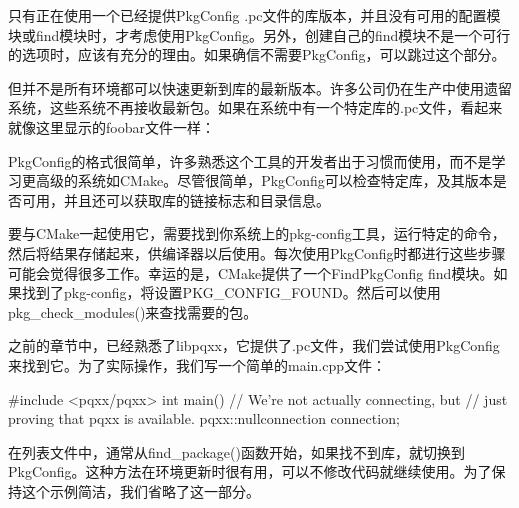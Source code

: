 只有正在使用一个已经提供PkgConfig .pc文件的库版本，并且没有可用的配置模块或find模块时，才考虑使用PkgConfig。另外，创建自己的find模块不是一个可行的选项时，应该有充分的理由。如果确信不需要PkgConfig，可以跳过这个部分。

但并不是所有环境都可以快速更新到库的最新版本。许多公司仍在生产中使用遗留系统，这些系统不再接收最新包。如果在系统中有一个特定库的.pc文件，看起来就像这里显示的foobar文件一样：


PkgConfig的格式很简单，许多熟悉这个工具的开发者出于习惯而使用，而不是学习更高级的系统如CMake。尽管很简单，PkgConfig可以检查特定库，及其版本是否可用，并且还可以获取库的链接标志和目录信息。

要与CMake一起使用它，需要找到你系统上的pkg-config工具，运行特定的命令，然后将结果存储起来，供编译器以后使用。每次使用PkgConfig时都进行这些步骤可能会觉得很多工作。幸运的是，CMake提供了一个FindPkgConfig find模块。如果找到了pkg-config，将设置PKG\_CONFIG\_FOUND。然后可以使用pkg\_check\_modules()来查找需要的包。

之前的章节中，已经熟悉了libpqxx，它提供了.pc文件，我们尝试使用PkgConfig来找到它。为了实际操作，我们写一个简单的main.cpp文件：


\begin{cpp}
#include <pqxx/pqxx>
int main()
{
    // We're not actually connecting, but
    // just proving that pqxx is available.
    pqxx::nullconnection connection;
}
\end{cpp}

在列表文件中，通常从find\_package()函数开始，如果找不到库，就切换到PkgConfig。这种方法在环境更新时很有用，可以不修改代码就继续使用。为了保持这个示例简洁，我们省略了这一部分。



